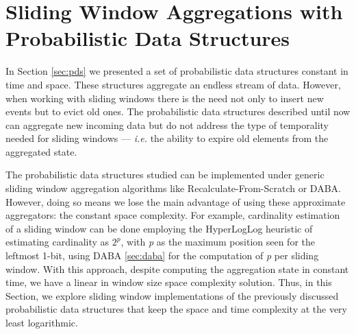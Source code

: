 \section{Sliding Window Aggregations with Probabilistic Data Structures} \label{sec:sliding-pds}
In Section \ref{sec:pds} we presented a set of probabilistic data structures constant in time and space. These structures aggregate an endless stream of data. However, when working with sliding windows there is the need not only to insert new events but to evict old ones. The probabilistic data structures described until now can aggregate new incoming data but do not address the type of temporality needed for sliding windows --- \textit{i.e.} the ability to expire old elements from the aggregated state.

The probabilistic data structures studied can be implemented under generic sliding window aggregation algorithms like Recalculate-From-Scratch or DABA. However, doing so means we lose the main advantage of using these approximate aggregators: the constant space complexity. For example, cardinality estimation of a sliding window can be done employing the HyperLogLog heuristic of estimating cardinality as $2^\textit{p}$, with \textit{p} as the maximum position seen for the leftmost 1-bit, using DABA \ref{sec:daba} for the computation of \textit{p} per sliding window. With this approach, despite computing the aggregation state in constant time, we have a linear in window size space complexity solution. Thus, in this Section, we explore sliding window implementations of the previously discussed probabilistic data structures that keep the space and time complexity at the very least logarithmic.


